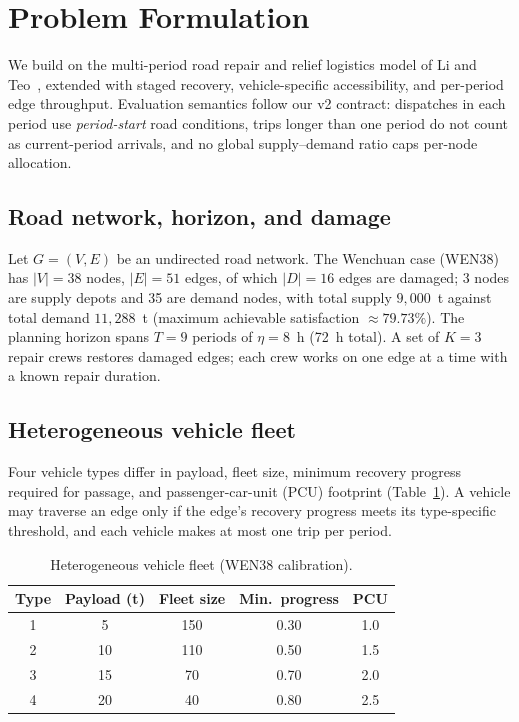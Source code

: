 \documentclass[10pt,conference,letterpaper]{IEEEtran}
\begin{document}
\section{Problem Formulation}
\label{sec:formulation}

We build on the multi-period road repair and relief logistics model of
Li and Teo~\cite{li2019post}, extended with staged recovery,
vehicle-specific accessibility, and per-period edge throughput. Evaluation
semantics follow our v2 contract: dispatches in each period use
\emph{period-start} road conditions, trips longer than one period do not
count as current-period arrivals, and no global supply--demand ratio caps
per-node allocation.

\subsection{Road network, horizon, and damage}

Let $G=(V,E)$ be an undirected road network. The Wenchuan case (WEN38) has
$|V|=38$ nodes, $|E|=51$ edges, of which $|D|=16$ edges are damaged; 3
nodes are supply depots and 35 are demand nodes, with total supply
$9{,}000$~t against total demand $11{,}288$~t (maximum achievable
satisfaction $\approx 79.73\%$). The planning horizon spans $T=9$ periods
of $\eta=8$~h (72~h total). A set of $K=3$ repair crews restores damaged
edges; each crew works on one edge at a time with a known repair duration.

\subsection{Heterogeneous vehicle fleet}

Four vehicle types differ in payload, fleet size, minimum recovery
progress required for passage, and passenger-car-unit (PCU) footprint
(Table~\ref{tab:fleet}). A vehicle may traverse an edge only if the edge's
recovery progress meets its type-specific threshold, and each vehicle
makes at most one trip per period.

\begin{table}[t]
\centering
\caption{Heterogeneous vehicle fleet (WEN38 calibration).}
\label{tab:fleet}
\begin{tabular}{ccccc}
\toprule
Type & Payload (t) & Fleet size & Min.\ progress & PCU \\
\midrule
1 & 5  & 150 & 0.30 & 1.0 \\
2 & 10 & 110 & 0.50 & 1.5 \\
3 & 15 & 70  & 0.70 & 2.0 \\
4 & 20 & 40  & 0.80 & 2.5 \\
\bottomrule
\end{tabular}
\end{table}
\end{document}
